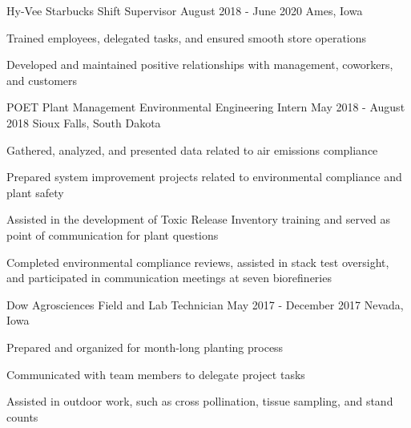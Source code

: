 

\begin{cventries}

\cventry
    {Hy-Vee} %
    {Starbucks Shift Supervisor} %
    {August 2018 - June 2020} %
    {Ames, Iowa} %
    {
      \begin{cvitems} %
      \setlength\itemsep{.4em}
        \item {Trained employees, delegated tasks, and ensured smooth store operations }
        \item {Developed and maintained positive relationships with management, coworkers, and customers}
      \end{cvitems}
    }
\vspace*{.5cm}
  \cventry
    {POET Plant Management} %
    {Environmental Engineering Intern} %
    {May 2018 - August 2018} %
    {Sioux Falls, South Dakota} %
    {
      \begin{cvitems} %
      \setlength\itemsep{.4em}
        \item {Gathered, analyzed, and presented data related to air emissions compliance}
        \item {Prepared system improvement projects related to environmental compliance and plant safety}
        \item {Assisted in the development of Toxic Release Inventory training and served as point of communication for plant questions}
        \item {Completed environmental compliance reviews, assisted in stack test oversight, and participated in communication meetings at seven biorefineries}
      \end{cvitems}
    }

\vspace*{.5cm}
  \cventry
    {Dow Agrosciences} %
    {Field and Lab Technician} %
    {May 2017 - December 2017} %
    {Nevada, Iowa} %
    {
      \begin{cvitems} %
      \setlength\itemsep{.4em}
        \item {Prepared and organized for month-long planting process}
        \item {Communicated with team members to delegate project tasks}
        \item {Assisted in outdoor work, such as cross pollination, tissue sampling, and stand counts}
      \end{cvitems}
    }

\end{cventries}
